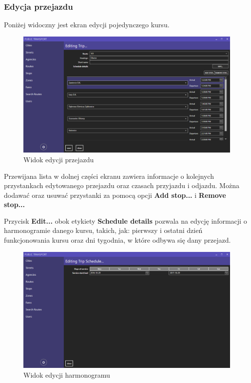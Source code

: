 \documentclass[10pt,a4paper]{article}
\begin{document}
\subsubsection{Edycja przejazdu}
Poniżej widoczny jest ekran edycji pojedynczego kursu.
\begin{figure}[H]
	\centering
	\includegraphics[width=15cm]{Resources/Images/11_edit_trip.png}
	\caption{Widok edycji przejazdu}
\end{figure}
Przewijana lista w dolnej części ekranu zawiera informacje o kolejnych przystankach edytowanego przejazdu oraz czasach przyjazdu i odjazdu. Można dodawać oraz usuwać przystanki za pomocą opcji \textbf{Add stop...} i \textbf{Remove stop...} 

Przycisk \textbf{Edit...} obok etykiety \textbf{Schedule details} pozwala na edycję informacji o harmonogramie danego kursu, takich, jak: pierwszy i ostatni dzień funkcjonowania kursu oraz dni tygodnia, w które odbywa się dany przejazd.
\begin{figure}[H]
	\centering
	\includegraphics[width=15cm]{Resources/Images/12_edit_schedule.png}
	\caption{Widok edycji harmonogramu}
\end{figure}
\end{document}
